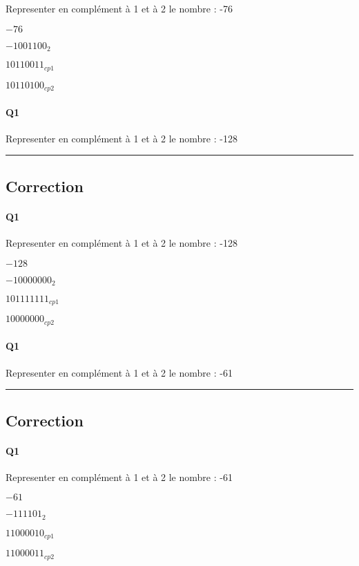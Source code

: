 Representer en complément à 1 et à 2 le nombre  : -76

$-76$

$ -1001100_{2}$

$ 10110011_{cp1}$

$ 10110100_{cp2}$
\pagebreak

\paragraph{Q1}

Representer en complément à 1 et à 2 le nombre  : -128


\hrule width 1\linewidth
\pagebreak

\subsection{Correction}


\paragraph{Q1}

Representer en complément à 1 et à 2 le nombre  : -128

$-128$

$-10000000_{2}$

$101111111_{cp1}$

$ 10000000_{cp2}$
\pagebreak

\paragraph{Q1}

Representer en complément à 1 et à 2 le nombre  : -61


\hrule width 1\linewidth
\pagebreak

\subsection{Correction}


\paragraph{Q1}

Representer en complément à 1 et à 2 le nombre  : -61

$-61$

$  -111101_{2}$

$ 11000010_{cp1}$

$ 11000011_{cp2}$
\pagebreak

